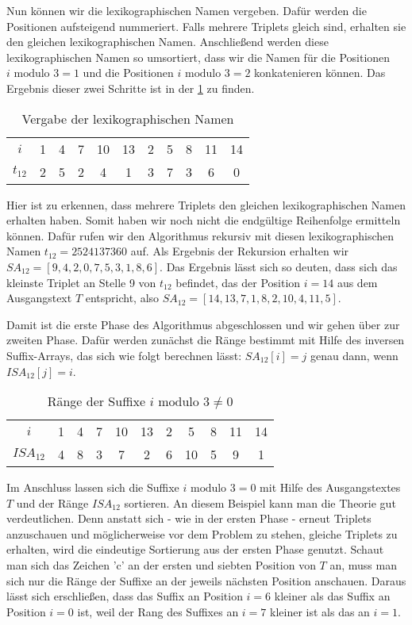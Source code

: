 Nun können wir die lexikographischen Namen vergeben. Dafür werden die Positionen aufsteigend nummeriert. Falls mehrere Triplets gleich sind, erhalten sie den gleichen lexikographischen Namen. Anschließend werden diese lexikographischen Namen so umsortiert, dass wir die Namen für die Positionen $i \text{ modulo } 3 = 1$ und die Positionen $i \text{ modulo } 3 = 2$ konkatenieren können. Das Ergebnis dieser zwei Schritte ist in der \cref{tab:lexNamen} zu finden.

\begin{table}[H]
	\centering
	\begin{tabular}{c| c c c c c c c c c c}
		$i$ & 1 & 4 & 7 & 10 & 13 & 2 & 5 & 8 & 11 & 14\\
		$t_{12}$ & 2 & 5 & 2 & 4 & 1 & 3 & 7 & 3 & 6 & 0
	\end{tabular}
	\caption{Vergabe der lexikographischen Namen}
	\label{tab:lexNamen}
\end{table}

Hier ist zu erkennen, dass mehrere Triplets den gleichen lexikographischen Namen erhalten haben. Somit haben wir noch nicht die endgültige Reihenfolge ermitteln können. Dafür rufen wir den Algorithmus rekursiv mit diesen lexikographischen Namen $t_{12} = 2524137360$ auf. Als Ergebnis der Rekursion erhalten wir $SA_{12} = [9, 4, 2, 0, 7, 5, 3, 1, 8, 6]$. Das Ergebnis lässt sich so deuten, dass sich das kleinste Triplet an Stelle 9 von $t_{12}$ befindet, das der Position $i = 14$ aus dem Ausgangstext $T$ entspricht, also $SA_{12} = [14, 13, 7, 1, 8, 2, 10, 4, 11, 5]$. 

Damit ist die erste Phase des Algorithmus abgeschlossen und wir gehen über zur zweiten Phase. Dafür werden zunächst die Ränge bestimmt mit Hilfe des inversen Suffix-Arrays, das sich wie folgt berechnen lässt: $SA_{12}[i] = j$ genau dann, wenn $ISA_{12}[j] = i$.

\begin{table}[H]
	\centering
	\begin{tabular}{c| c c c c c c c c c c}
		$i$ & 1 & 4 & 7 & 10 & 13 & 2 & 5 & 8 & 11 & 14 \\
		${ISA}_{12}$ & 4 & 8 & 3 & 7 & 2 & 6 & 10 & 5 & 9 & 1
	\end{tabular}
	\caption{Ränge der Suffixe $i \text{ modulo } 3 \neq 0$}
	\label{tab:ergebnis_rek}
\end{table}

Im Anschluss lassen sich die Suffixe $i \text{ modulo } 3 = 0$ mit Hilfe des Aus\-gangs\-text\-es $T$ und der Ränge ${ISA}_{12}$ sortieren. An diesem Beispiel kann man die Theorie gut verdeutlichen. Denn anstatt sich - wie in der ersten Phase - erneut Triplets anzuschauen und möglicherweise vor dem Problem zu stehen, gleiche Triplets zu erhalten, wird die eindeutige Sortierung aus der ersten Phase genutzt. Schaut man sich das Zeichen 'c' an der ersten und siebten Position von $T$ an, muss man sich nur die Ränge der Suffixe an der jeweils nächsten Position anschauen. Daraus lässt sich erschließen, dass das Suffix an Position $i = 6$ kleiner als das Suffix an Position $i = 0$ ist, weil der Rang des Suffixes an $i = 7$ kleiner ist als das an $i = 1$.

